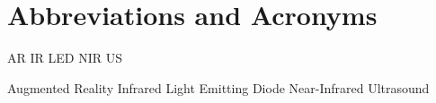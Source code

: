 \chapter{Abbreviations and Acronyms}\label{chapter:abbreviations}

\begin{multicols}{2}
\setlength{\parindent}{0pt}

	AR
	\hfill \break 
	IR
	\hfill \break 
	LED
	\hfill \break 
	NIR
	\hfill \break 
	US


	
\columnbreak
 
	Augmented Reality
	\hfill \break 
	Infrared
	\hfill \break 
	Light Emitting Diode
 	\hfill \break
	Near-Infrared
 	\hfill \break
	Ultrasound

\end{multicols}